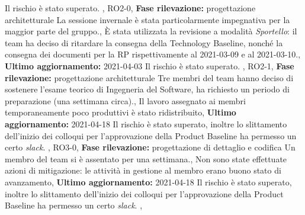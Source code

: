 {{        Il rischio è stato superato.
    },
    {
        RO2-0,
        \noexpand\textbf{Fase rilevazione:} progettazione architetturale \noexpand\newline
        La sessione invernale è stata particolarmente impegnativa per la maggior parte del gruppo.,
        È stata utilizzata la revisione a modalità \noexpand\textit{Sportello}: il team ha deciso di ritardare la consegna della Technology Baseline{,} nonché la consegna dei documenti per la RP rispettivamente al 2021-03-09 e al 2021-03-10.,
        \noexpand\textbf{Ultimo aggiornamento:} 2021-04-03 \noexpand\newline
        Il rischio è stato superato.
    },
    {
        RO2-1,
        \noexpand\textbf{Fase rilevazione:} progettazione architetturale \noexpand\newline
        Tre membri del team hanno deciso di sostenere l'esame teorico di Ingegneria del Software{,} ha richiesto un periodo di preparazione 
        (una settimana circa).,
        Il lavoro assegnato ai membri temporaneamente poco produttivi è stato ridistribuito,
        \noexpand\textbf{Ultimo aggiornamento:} 2021-04-18 \noexpand\newline
        Il rischio è stato superato{,} inoltre lo slittamento dell'inizio dei colloqui per l'approvazione della Product Baseline 
        ha permesso un certo \noexpand\textit{slack}.
    },
    {
        RO3-0,
        \noexpand\textbf{Fase rilevazione:} progettazione di dettaglio e codifica \noexpand\newline
        Un membro del team si è assentato per  una settimana.,
        Non sono state effettuate azioni di mitigazione: le attività in gestione al membro erano buono stato di avanzamento,
        \noexpand\textbf{Ultimo aggiornamento:} 2021-04-18 \noexpand\newline
        Il rischio è stato superato{,} inoltre lo slittamento dell'inizio dei colloqui per l'approvazione della Product Baseline 
        ha permesso un certo \noexpand\textit{slack}.
    },
}


